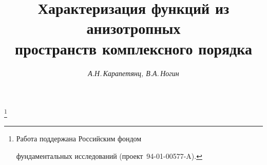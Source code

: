




%








\newcommand{\la}{\langle}


\newcommand{\ra}{\rangle}


\newcommand{\re}{\operatorname{Re}}


\newcommand{\im}{\operatorname{Im}}


\newcommand{\spaceL}{L^{\ov\alpha}_{p,r}}


\newcommand{\tts}[1]{}


\renewcommand{\baselinestretch}{1.05}


\renewcommand{\thesection}{\Roman{section}}










\setcounter{page}{24}












\author{\it А.Н.\,Карапетянц, В.А.\,Ногин}




\title{Характеризация функций из анизотропных\\


пространств комплексного порядка}





\thanks{Работа поддержана Российским фондом


фундаментальных исследований (проект \No\,94-01-00577-A).}


